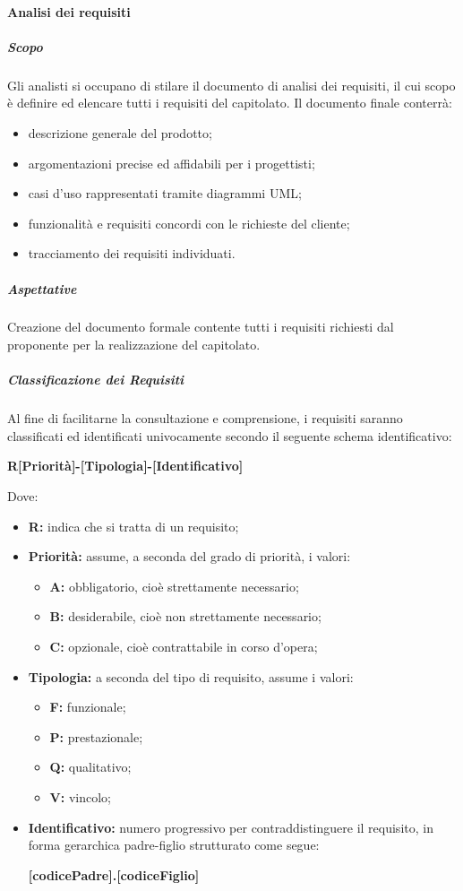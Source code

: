 			\paragraph{Analisi dei requisiti}
				\subparagraph{Scopo}
					Gli analisti si occupano di stilare il documento di analisi dei requisiti, il cui scopo è definire ed elencare tutti i requisiti del capitolato. Il documento finale conterrà:
					\begin{itemize}
						\item descrizione generale del prodotto;
						\item argomentazioni precise ed affidabili per i progettisti;
						\item casi d'uso rappresentati tramite diagrammi UML;
						\item funzionalità e requisiti concordi con le richieste del cliente;
						\item tracciamento dei requisiti individuati.
					\end{itemize}
				\subparagraph{Aspettative}
					Creazione del documento formale contente tutti i requisiti richiesti dal proponente per la realizzazione del capitolato.
				\subparagraph{Classificazione dei Requisiti}
					Al fine di facilitarne la consultazione e comprensione, i requisiti saranno classificati ed identificati univocamente secondo il seguente schema identificativo:
					\begin{center}
						\textbf{R[Priorità]-[Tipologia]-[Identificativo]}
					\end{center}
					Dove:
					\begin{itemize}
						\item \textbf{R:} indica che si tratta di un requisito;
						\item \textbf{Priorità:} assume, a seconda del grado di priorità, i valori:
						\begin{itemize}
							\item \textbf{A:} obbligatorio, cioè strettamente necessario;
							\item \textbf{B:} desiderabile, cioè non strettamente necessario;
							\item \textbf{C:} opzionale, cioè contrattabile in corso d'opera;
						\end{itemize}
						\item \textbf{Tipologia:} a seconda del tipo di requisito, assume i valori:
						\begin{itemize}
							\item \textbf{F:} funzionale;
							\item \textbf{P:} prestazionale;
							\item \textbf{Q:} qualitativo;
							\item \textbf{V:} vincolo;
						\end{itemize}
						\item \textbf{Identificativo:} numero progressivo per contraddistinguere il requisito, in forma gerarchica padre-figlio strutturato come segue:
						\begin{center}
							\textbf{[codicePadre].[codiceFiglio]}
						\end{center}
					\end{itemize}

